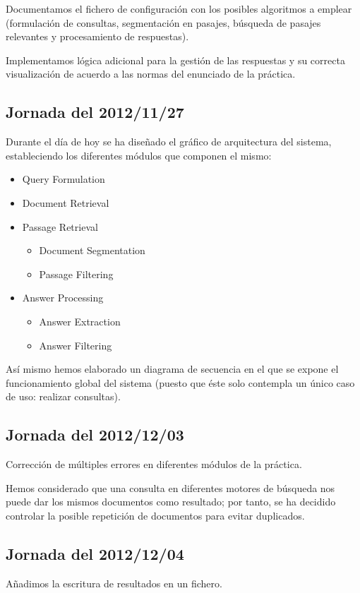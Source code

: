 \documentclass[12pt,a4paper,titlepage]{article}
\begin{document}
Documentamos el fichero de configuración con los posibles algoritmos a emplear (formulación de consultas, segmentación en pasajes, búsqueda de pasajes relevantes y procesamiento de respuestas).

Implementamos lógica adicional para la gestión de las respuestas y su correcta visualización de acuerdo a las normas del enunciado de la práctica.

\subsection{Jornada del 2012/11/27}
Durante el día de hoy se ha diseñado el gráfico de arquitectura del sistema, estableciendo los diferentes módulos que componen el mismo:

\begin{itemize}
\item Query Formulation
\item Document Retrieval
\item Passage Retrieval
	\begin{itemize}
	\item Document Segmentation
	\item Passage Filtering
	\end{itemize}
\item Answer Processing
	\begin{itemize}
	\item Answer Extraction
	\item Answer Filtering
	\end{itemize}
\end{itemize}

Así mismo hemos elaborado un diagrama de secuencia en el que se expone el funcionamiento global del sistema (puesto que éste solo contempla un único caso de uso: realizar consultas).

\subsection{Jornada del 2012/12/03}
Corrección de múltiples errores en diferentes módulos de la práctica.

Hemos considerado que una consulta en diferentes motores de búsqueda nos puede dar los mismos documentos como resultado; por tanto, se ha decidido controlar la posible repetición de documentos para evitar duplicados.

\subsection{Jornada del 2012/12/04}
Añadimos la escritura de resultados en un fichero.
\end{document}
